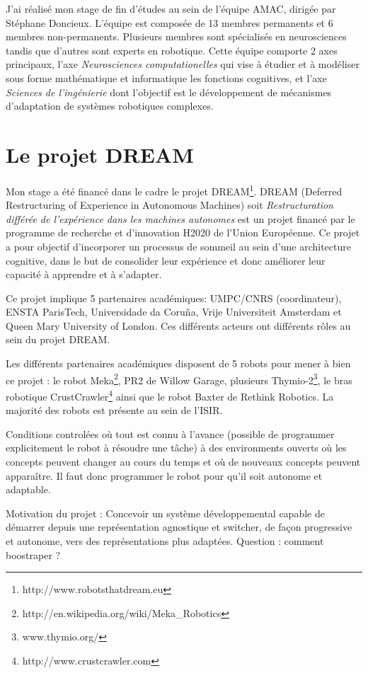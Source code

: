 \documentclass{llncs}
\begin{document}
J'ai réalisé mon stage de fin d'études au sein de l'équipe AMAC, dirigée par Stéphane Doncieux. L'équipe est composée de 13 membres permanents et 6 membres non-permanents. Plusieurs membres sont spécialisés en neurosciences tandis que d'autres sont experts en robotique. Cette équipe comporte 2 axes principaux, l'axe \textit{Neurosciences computationelles} qui vise à étudier et à modéliser sous forme mathématique et informatique les fonctions cognitives, et l'axe \textit{Sciences de l'ingénierie} dont l'objectif est le développement de mécanismes d'adaptation de systèmes robotiques complexes.




\section{Le projet DREAM}
Mon stage a été financé dans le cadre le projet DREAM\footnote{http://www.robotsthatdream.eu}. DREAM (Deferred Restructuring of Experience in Autonomous Machines) soit \textit{Restructuration différée de l'expérience dans les machines autonomes} est un projet financé par le programme de recherche et d'innovation H2020 de l'Union Européenne. Ce projet a pour objectif d'incorporer un processus de sommeil au sein d'une architecture cognitive, dans le but de consolider leur expérience et donc améliorer leur capacité à apprendre et à s'adapter.

Ce projet implique 5 partenaires académiques: UMPC/CNRS (coordinateur), ENSTA ParisTech, Universidade da Coruña, Vrije Universiteit Amsterdam et Queen Mary University of London. Ces différents acteurs ont différents rôles au sein du projet DREAM.

Les différents partenaires académiques disposent de 5 robots pour mener à bien ce projet : le robot Meka\footnote{http://en.wikipedia.org/wiki/Meka\_Robotics}, PR2 de Willow Garage, plusieurs Thymio-2\footnote{www.thymio.org/}, le bras robotique CrustCrawler\footnote{http://www.crustcrawler.com} ainsi que le robot Baxter de Rethink Robotics. La majorité des robots est présente au sein de l'ISIR.

Conditions controlées où tout est connu à l'avance (possible de programmer explicitement le robot à résoudre une tâche) à des environments ouverts où les concepts peuvent changer au cours du temps et où de nouveaux concepts peuvent apparaître. Il faut donc programmer le robot pour qu'il soit autonome et adaptable.

Motivation du projet : Concevoir un système développemental capable de démarrer depuis une représentation agnostique et switcher, de façon progressive et autonome, vers des représentations plus adaptées. Question : comment boostraper ?
\end{document}
